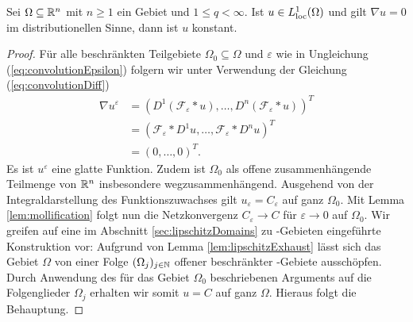 \begin{lem}
  Sei $\Omega \subseteq \mathbb{R}^n$ mit $n \geq 1$ ein Gebiet und $1 \leq q < \infty$.
  Ist $u \in L^1_{\operatorname{loc}}(\Omega)$ und gilt $\nabla u = 0$ im distributionellen Sinne, dann ist $u$ konstant.
\end{lem}

\begin{proof}
  Für alle beschränkten Teilgebiete $\Omega_0 \subseteq \Omega$ und $\varepsilon$ wie in Ungleichung (\ref{eq:convolutionEpsilon}) folgern wir unter Verwendung der Gleichung (\ref{eq:convolutionDiff})
  \begin{align*}
    \nabla u^\varepsilon
    &= (D^1 (\mathcal{F}_\varepsilon \ast u), \dots, D^n (\mathcal{F}_\varepsilon \ast u))^T \\
    &= ( \mathcal{F}_\varepsilon \ast D^1 u, \dots, \mathcal{F}_\varepsilon \ast D^n u)^T \\
    &= (0, \dots, 0)^T.
  \end{align*}
  Es ist $u^\varepsilon$ eine glatte Funktion.
  Zudem ist $\Omega_0$ als offene zusammenhängende Teilmenge von $\mathbb{R}^n$ insbesondere wegzusammenhängend.
  Ausgehend von der Integraldarstellung des Funktionszuwachses \cite[S.57]{koenigsberger2004ana2} gilt $u_\varepsilon = C_\varepsilon$ auf ganz $\Omega_0$.
  Mit Lemma \ref{lem:mollification} folgt nun die Netzkonvergenz $C_\varepsilon \to C$ für $\varepsilon \to 0$ auf $\Omega_0$.
  Wir greifen auf eine im Abschnitt \ref{sec:lipschitzDomains} zu \lipschitz\hyp{}Gebieten eingeführte Konstruktion vor:
  Aufgrund von Lemma \ref{lem:lipschitzExhaust} lässt sich das Gebiet $\Omega$ von einer Folge $(\Omega_j)_{j \in \mathbb{N}}$ offener beschränkter \lipschitz\hyp{}Gebiete ausschöpfen. 
  Durch Anwendung des für das Gebiet $\Omega_0$ beschriebenen Arguments auf die Folgenglieder $\Omega_j$ erhalten wir somit $u = C$ auf ganz $\Omega$. 
  Hieraus folgt die Behauptung.
\end{proof}

